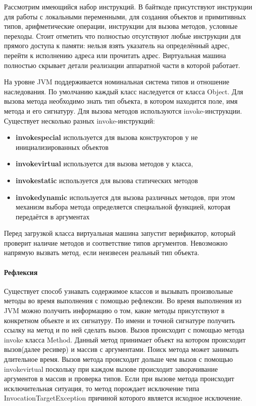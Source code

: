 Рассмотрим имеющийся набор инструкций. В байткоде присутствуют инструкции для работы с локальными переменными, для создания объектов и примитивных типов, арифметические операции, инструкции для вызова методов, условные переходы. Стоит отметить что полностью отсутствуют любые инструкции для прямого доступа к памяти: нельзя взять указатель на определённый адрес, перейти к исполнению адреса или прочитать адрес. Виртуальная машина полностью скрывает детали реализации аппаратной части в которой работает.

На уровне JVM поддерживается номинальная система типов и отношение наследования. По умолчанию каждый класс наследуется от класса Object. Для вызова метода необходимо знать тип объекта, в котором находится поле, имя метода и его сигнатуру. Для вызова методов используются invoke-инструкции. Существует несколько разных invoke-инструкций:
\begin{itemize}
    \item \textbf{invokespecial} используется для вызова конструкторов у не инициализированных объектов
    \item \textbf{invokevirtual} используется для вызова методов у класса,
    \item \textbf{invokestatic} используется для вызова статических методов
    \item \textbf{invokedynamic} используется для вызова различных методов, при этом механизм выбора метода определяется специальной функцией, которая передаётся в аргументах
\end{itemize}
Перед загрузкой класса виртуальная машина запустит верификатор, который проверит наличие методов и соответствие типов аргументов. Невозможно напрямую вызвать метод, если неизвесен реальный тип объекта.

\paragraph{Рефлексия}

Существует способ узнавать содержимое классов и вызывать произвольные методы во время выполнения с помощью рефлексии. Во время выполнения из JVM можно получить информацию о том, какие методы присутствуют в конкретном объекте и их сигнатуру. По имени и точной сигнатуре получить ссылку на метод и по ней сделать вызов. Вызов происходит с помощью метода invoke класса Method. Данный метод принимает объект на котором происходит вызов(далее ресивер) и массив с аргументами. Поиск метода может занимать длительное время. Вызов метода происходит дольше чем вызов с помощью invokevirtual поскольку при каждом вызове происходит заворачивание аргументов в массив и проверка типов. Если при вызове метода происходит исключительная ситуация, то метод порождает исключение типа InvocationTargetException причиной которого является исходное исключение.

